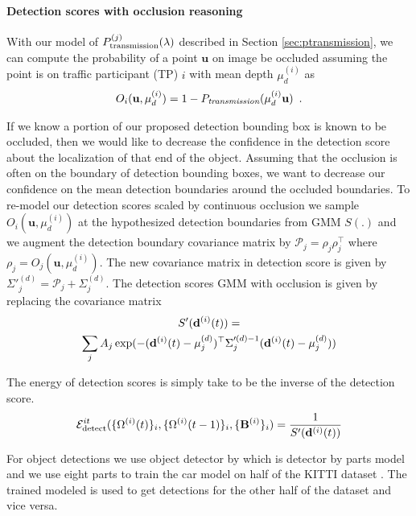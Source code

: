 \paragraph{Detection scores with occlusion reasoning} 
\def\u{\mathbf{u}}
With our model of $P^{(j)}_{\text{transmission}}(\lambda)$ described in Section \ref{sec:ptransmission}, we can
compute the probability of a point $\u$ on image be occluded assuming
the point is on traffic participant (TP) $i$ with mean depth $\mu^{(i)}_d$ as
\begin{align}
  O_{i}(\u, \mu^{(i)}_d) = 1 - \Ptransmission(\mu^{(i)}_d\u) \enspace .
\end{align}

If we know a portion of our proposed detection bounding box is known to be
occluded, then we would like to decrease the confidence in the detection score
about the localization of that end of the object. Assuming that the occlusion
is often on the boundary of detection bounding boxes, we want to decrease our
confidence on the mean detection boundaries around the occluded boundaries.
To re-model our detection scores scaled by continuous occlusion we sample
$O_{i}(\mathbf{u}, \mu^{(i)}_d)$ at the hypothesized detection boundaries from
GMM $S(.)$ and we augment the detection boundary covariance matrix by
$\mathcal{P}_{j} = \rho_{j}\rho_{j}^\top$ where $\rho_{j} = O_{j}(\mathbf{u},
\mu^{(i)}_d)$. The new covariance matrix in detection score is given by 
  $\Sigma'^{(d)}_j = \mathcal{P}_{j} + \Sigma^{(d)}_j$.
The detection scores GMM with occlusion is given by replacing the covariance
matrix
%
\begin{multline}
  S'(\mathbf{d}^{(i)}(t)) =
  \\
  \sum_j A_j \exp(-(\mathbf{d}^{(i)}(t)-\mu^{(d)}_j)^\top \Sigma'^{(d)-1}_j
  (\mathbf{d}^{(i)}(t)-\mu^{(d)}_j))
\end{multline}

The energy of detection scores is simply take to be the inverse of the detection score.
\begin{align}
  \mathcal{E}^{it}_{\text{detect}}(\{ \Omega^{(i)}(t) \}_i, \{ \Omega^{(i)}(t-1) \}_i, \{\mathbf{B}^{(i)}\}_i ) = \frac{1}{S'(\mathbf{d}^{(i)}(t))}
\end{align}

For object detections we use object detector by \cite{Felzenszwalb_etal_2010}
which is detector by parts model and we use eight parts to train the car model 
on half of the KITTI dataset \cite{geiger2013vision}. The trained modeled is 
used to get detections for the other half of the dataset and vice versa. 

